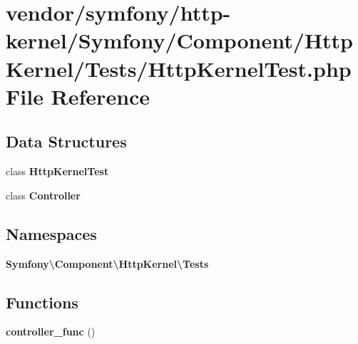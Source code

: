 \section{vendor/symfony/http-\/kernel/\+Symfony/\+Component/\+Http\+Kernel/\+Tests/\+Http\+Kernel\+Test.php File Reference}
\label{_http_kernel_test_8php}
\subsection*{Data Structures}
\begin{DoxyCompactItemize}
\item 
class {\bf Http\+Kernel\+Test}
\item 
class {\bf Controller}
\end{DoxyCompactItemize}
\subsection*{Namespaces}
\begin{DoxyCompactItemize}
\item 
 {\bf Symfony\textbackslash{}\+Component\textbackslash{}\+Http\+Kernel\textbackslash{}\+Tests}
\end{DoxyCompactItemize}
\subsection*{Functions}
\begin{DoxyCompactItemize}
\item 
{\bf controller\+\_\+func} ()
\end{DoxyCompactItemize}
